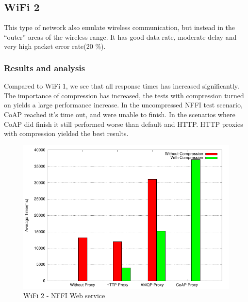 \subsection{WiFi 2}

This type of network also emulate wireless communication, but instead in the
``outer'' areas of the wireless range. It has good data rate, moderate delay
and very high packet error rate(20 \%).


\subsubsection{Results and analysis}

Compared to WiFi 1, we see that all response times has increased
significantly. The importance of compression has increased, the tests with
compression turned on yields a large performance increase. In the uncompressed
NFFI test scenario, CoAP reached it's time out, and were unable to finish. In
the scenarios where CoAP did finish it still performed worse than default and
HTTP. HTTP proxies with compression yielded the best results.

\begin{figure}[H]
\center
\includegraphics[scale=0.75]{../results/wifi2/nffi/result.pdf}
\caption{WiFi 2 - NFFI Web service}
\end{figure}

